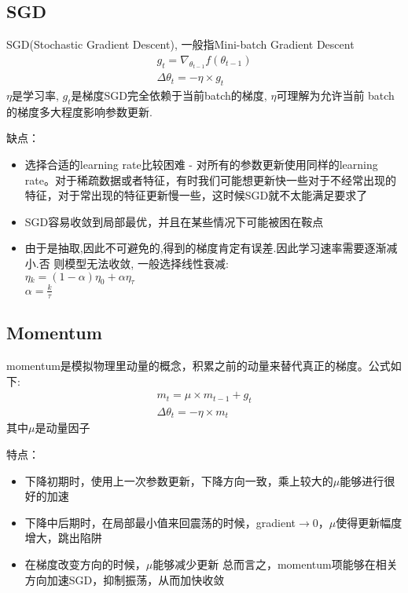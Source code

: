 \documentclass[hyperref, UTF-8]{ctexart}
\begin{document}
\subsection{SGD}
SGD(Stochastic Gradient Descent), 一般指Mini-batch Gradient Descent
\begin{eqnarray*}
  g_t = \nabla_{\theta_{t-1}}f(\theta_{t-1})  \\
  \Delta{\theta_t} = -\eta\times g_t
\end{eqnarray*}
$\eta$是学习率, $g_t$是梯度SGD完全依赖于当前batch的梯度, $\eta$可理解为允许当前
batch的梯度多大程度影响参数更新.

缺点：
\begin{itemize}
\item 选择合适的learning rate比较困难 - 对所有的参数更新使用同样的learning rate。对于稀疏数据或者特征，有时我们可能想更新快一些对于不经常出现的特征，对于常出现的特征更新慢一些，这时候SGD就不太能满足要求了
\item SGD容易收敛到局部最优，并且在某些情况下可能被困在鞍点
\item 由于是抽取,因此不可避免的,得到的梯度肯定有误差.因此学习速率需要逐渐减小.否
  则模型无法收敛, 一般选择线性衰减:  \\ $\eta{_k}=(1−\alpha)\eta_0+\alpha\eta_{\tau}$  \\
  $\alpha=\frac{k}{\tau}$
\end{itemize}

\subsection{Momentum}
momentum是模拟物理里动量的概念，积累之前的动量来替代真正的梯度。公式如下:
\begin{eqnarray*}
  m_t = \mu \times m_{t-1} + g_t  \\
  \Delta\theta_t = -\eta \times m_t
\end{eqnarray*}
其中$\mu$是动量因子 

特点：
\begin{itemize}
\item 下降初期时，使用上一次参数更新，下降方向一致，乘上较大的$\mu$能够进行很好的加速
\item 下降中后期时，在局部最小值来回震荡的时候，gradient$\to$0，$\mu$使得更新幅度增大，跳出陷阱
\item 在梯度改变方向的时候，$\mu$能够减少更新 总而言之，momentum项能够在相关方向加速SGD，抑制振荡，从而加快收敛
\end{itemize}
\end{document}
